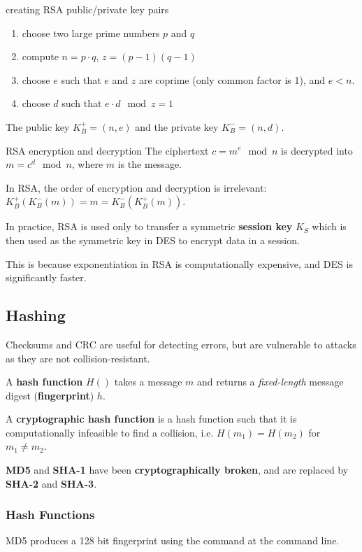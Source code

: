 \begin{defn*}{creating RSA public/private key pairs}
    \begin{enumerate}
        \item choose two large prime numbers $p$ and $q$
        \item compute $n = p \cdot q$, $z = (p - 1)(q - 1)$
        \item choose $e$ such that $e$ and $z$ are coprime (only common factor is 1), and $e < n$.
        \item choose $d$ such that $e \cdot d \mod{z} = 1$ 
    \end{enumerate}
    The public key $K_B^+ = (n, e)$ and the private key $K_B^- = (n, d)$.
\end{defn*}

\begin{defn}{RSA encryption and decryption}
    The ciphertext $c = m^e \mod{n}$ is decrypted into \\ $m = c^d \mod{n}$, where $m$ is the message.
\end{defn}

In RSA, the order of encryption and decryption is irrelevant: $K_B^+(K_B^-(m)) = m = K_B^-(K_B^+(m))$.

In practice, RSA is used only to transfer a symmetric \textbf{session key} $K_S$ which is then used
as the symmetric key in DES to encrypt data in a session.

This is because exponentiation in RSA is computationally expensive, and DES is significantly faster.

\subsection{Hashing}
Checksums and CRC are useful for detecting errors, but are vulnerable to attacks as they are not
collision-resistant.

A \textbf{hash function} $H()$ takes a message $m$ and returns a \textit{fixed-length} message digest
(\textbf{fingerprint}) $h$.

A \textbf{cryptographic hash function} is a hash function such that it is computationally infeasible
to find a collision, i.e. $H(m_1) = H(m_2)$ for $m_1 \neq m_2$.

\textbf{MD5} and \textbf{SHA-1} have been \textbf{cryptographically broken},
and are replaced by \textbf{SHA-2} and \textbf{SHA-3}.

\subsubsection{Hash Functions}
MD5 produces a 128 bit fingerprint using the  command at the command line.


